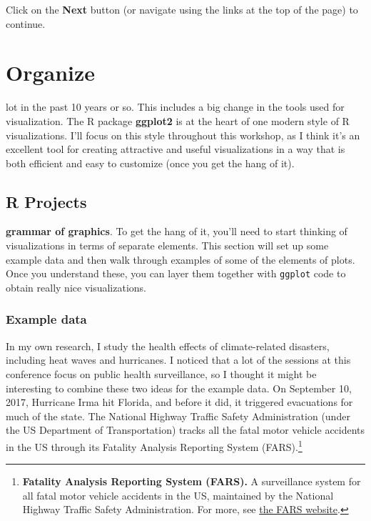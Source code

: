 \documentclass[]{tufte-book}
\begin{document}
Click on the \textbf{Next} button (or navigate using the
links at the top of the page) to continue.

\hypertarget{organize}{%
\chapter{Organize}\label{organize}}

 lot in the past 10 years or so. This
includes a big
change in the tools used for visualization. The R package \textbf{ggplot2} \citep{R-ggplot2}
is at the heart of one modern style of R visualizations. I'll focus on this style
throughout this workshop, as I think it's an excellent tool for creating
attractive and useful visualizations in a way that is both efficient and easy
to customize (once you get the hang of it).

\hypertarget{r-projects}{%
\section{R Projects}\label{r-projects}}

 \textbf{grammar of graphics}. To get the hang
of it, you'll need to start thinking of visualizations in terms of separate elements.
This section will set up some example data and then walk through examples of some of
the elements of plots. Once you understand these, you can layer them together with
\texttt{ggplot} code to obtain really nice visualizations.

\hypertarget{example-data}{%
\subsection{Example data}\label{example-data}}

In my own research, I study the health effects of climate-related disasters, including
heat waves and hurricanes. I noticed that a lot of the sessions at this conference
focus on public health surveillance, so I thought it might be interesting to combine
these two ideas for the example data. On September 10, 2017, Hurricane Irma hit Florida,
and before it did, it triggered evacuations for much of the state. The National Highway
Traffic Safety Administration (under the US Department of Transportation) tracks all
the fatal motor vehicle accidents in the US through its Fatality Analysis Reporting
System (FARS).\footnote{\textbf{Fatality Analysis Reporting System (FARS).} A surveillance system
  for all fatal motor vehicle accidents in the US, maintained by the National Highway
  Traffic Safety Administration. For more, see
  \href{https://www.nhtsa.gov/research-data/fatality-analysis-reporting-system-fars}{the FARS website}.}
\end{document}

